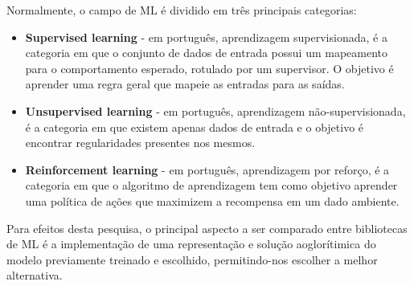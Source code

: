 Normalmente, o campo de ML é dividido em três principais categorias:

\begin{itemize}
  \item \textbf{Supervised learning} - em português, aprendizagem supervisionada, é a categoria em que o conjunto de dados de entrada possui um mapeamento para o comportamento esperado, rotulado por um supervisor. O objetivo é aprender uma regra geral que mapeie as entradas para as saídas. \cite{alpaydin2020introduction}
  \item \textbf{Unsupervised learning} - em português, aprendizagem não-supervisionada, é a categoria em que existem apenas dados de entrada e o objetivo é encontrar regularidades presentes nos mesmos. \cite{alpaydin2020introduction}
  \item \textbf{Reinforcement learning} - em português, aprendizagem por reforço, é a categoria em que o algoritmo de aprendizagem tem como objetivo aprender uma política de ações que maximizem a recompensa em um dado ambiente. \cite{alpaydin2020introduction}
\end{itemize}

Para efeitos desta pesquisa, o principal aspecto a ser comparado entre bibliotecas de ML é a implementação de uma representação e solução aoglorítimica do modelo previamente treinado e escolhido, permitindo-nos escolher a melhor alternativa.
